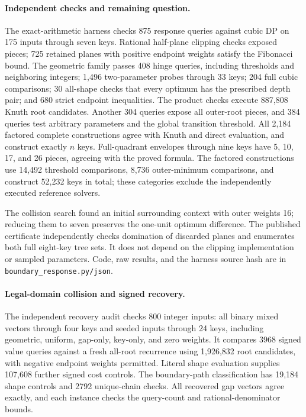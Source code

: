 \documentclass[11pt]{article}
\begin{document}
\paragraph{Independent checks and remaining question.}
The exact-arithmetic harness checks 875 response queries against cubic DP
on 175 inputs through seven keys. Rational half-plane clipping checks
exposed pieces; 725 retained planes with positive endpoint weights satisfy
the Fibonacci bound. The geometric family passes 408 hinge queries,
including thresholds and neighboring integers; 1,496 two-parameter probes
through 33 keys; 204 full cubic comparisons; 30 all-shape checks that
every optimum has the prescribed depth pair; and 680 strict endpoint
inequalities. The product checks execute 887,808 Knuth root candidates.
Another 304 queries expose all outer-root pieces, and 384 queries test
arbitrary parameters and the global transition threshold. All 2,184
factored complete constructions agree with Knuth and direct evaluation,
and construct exactly $n$ keys. Full-quadrant envelopes through nine
keys have 5, 10, 17, and 26 pieces, agreeing with the proved formula.
The factored constructions use 14,492 threshold comparisons, 8,736
outer-minimum comparisons, and construct 52,232 keys in total; these
categories exclude the independently executed reference solvers.

The collision search found an initial surrounding context with outer
weights 16; reducing them to seven preserves the one-unit optimum
difference. The published certificate independently checks domination
of discarded planes and enumerates both full eight-key tree sets.
It does not depend on the clipping implementation or sampled parameters.
Code, raw results, and the harness source hash are in
\texttt{boundary\_response.py/json}.

\paragraph{Legal-domain collision and signed recovery.}\label{app:signed-boundary}
The independent recovery audit checks 800 integer inputs: all binary mixed
vectors through four keys and seeded inputs through 24 keys, including
geometric, uniform, gap-only, key-only, and zero weights. It compares 3968
signed value queries against a fresh all-root recurrence using 1,926,832
root candidates, with negative endpoint weights permitted. Literal shape
evaluation supplies 107,608 further signed cost controls. The boundary-path
classification has 19,184 shape controls and 2792 unique-chain checks.
All recovered gap vectors agree exactly, and each instance checks the
query-count and rational-denominator bounds.
\end{document}

